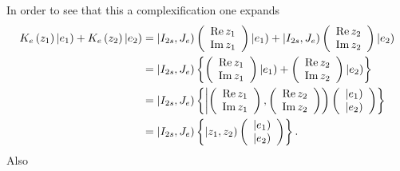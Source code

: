 \documentclass[aps,preprint]{revtex4}%
\begin{document}
In order to see that this a complexification one expands
\begin{align}
K_{e}\left(  z_{1}\right)  \left\vert e_{1}\right)  +K_{e}\left(
z_{2}\right)  \left\vert e_{2}\right)   &  =\left\vert I_{2s},J_{e}\right)
\left(
\begin{array}
[c]{c}%
\operatorname{Re}z_{1}\\
\operatorname{Im}z_{1}%
\end{array}
\right)  \left\vert e_{1}\right)  +\left\vert I_{2s},J_{e}\right)  \left(
\begin{array}
[c]{c}%
\operatorname{Re}z_{2}\\
\operatorname{Im}z_{2}%
\end{array}
\right)  \left\vert e_{2}\right) \\
&  =\left\vert I_{2s},J_{e}\right)  \left\{  \left(
\begin{array}
[c]{c}%
\operatorname{Re}z_{1}\\
\operatorname{Im}z_{1}%
\end{array}
\right)  \left\vert e_{1}\right)  +\left(
\begin{array}
[c]{c}%
\operatorname{Re}z_{2}\\
\operatorname{Im}z_{2}%
\end{array}
\right)  \left\vert e_{2}\right)  \right\} \\
&  =\left\vert I_{2s},J_{e}\right)  \left\{  \left\vert \left(
\begin{array}
[c]{c}%
\operatorname{Re}z_{1}\\
\operatorname{Im}z_{1}%
\end{array}
\right)  ,\left(
\begin{array}
[c]{c}%
\operatorname{Re}z_{2}\\
\operatorname{Im}z_{2}%
\end{array}
\right)  \right)  \left(
\begin{array}
[c]{c}%
\left\vert e_{1}\right) \\
\left\vert e_{2}\right)
\end{array}
\right)  \right\} \\
&  =\left\vert I_{2s},J_{e}\right)  \left\{  \left\vert z_{1},z_{2}\right)
\left(
\begin{array}
[c]{c}%
\left\vert e_{1}\right) \\
\left\vert e_{2}\right)
\end{array}
\right)  \right\}  .
\end{align}
Also
\end{document}
